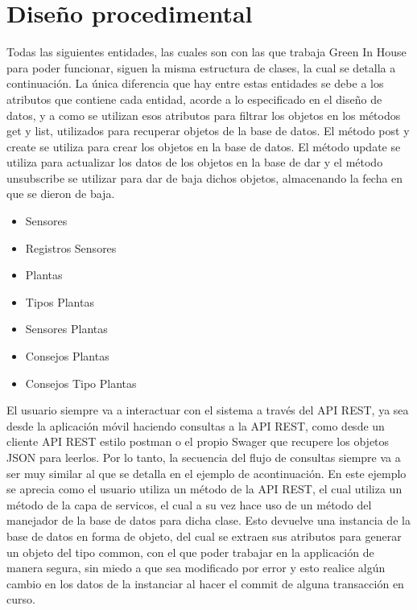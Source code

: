 \section{Diseño procedimental}
Todas las siguientes entidades, las cuales son con las que trabaja Green In House para poder funcionar, siguen la misma estructura de clases, la cual se detalla a continuación. La única diferencia que hay entre estas entidades se debe a los atributos que contiene cada entidad, acorde a lo especificado en el diseño de datos, y a como se utilizan esos atributos para filtrar los objetos en los métodos get y list, utilizados para recuperar objetos de la base de datos. El método post y create se utiliza para crear los objetos en la base de datos. El método update se utiliza para actualizar los datos de los objetos en la base de dar y el método unsubscribe se utilizar para dar de baja dichos objetos, almacenando la fecha en que se dieron de baja.
\begin{itemize}
        \item Sensores
        \item Registros Sensores
        \item Plantas
        \item Tipos Plantas
        \item Sensores Plantas
        \item Consejos Plantas
        \item Consejos Tipo Plantas
    \end{itemize}
    
  





El usuario siempre va a interactuar con el sistema a través del API REST, ya sea desde la aplicación móvil haciendo consultas a la API REST, como desde un cliente API REST estilo postman o el propio Swager que recupere los objetos JSON para leerlos. Por lo tanto, la secuencia del flujo de consultas siempre va a ser muy similar al que se detalla en el ejemplo de acontinuación. En este ejemplo se aprecia como el usuario utiliza un método de la API REST, el cual utiliza un método de la capa de servicos, el cual a su vez hace uso de un método del manejador de la base de datos para dicha clase. Esto devuelve una instancia de la base de datos en forma de objeto, del cual se extraen sus atributos para generar un objeto del tipo common, con el que poder trabajar en la applicación de manera segura, sin miedo a que sea modificado por error y esto realice algún cambio en los datos de la instanciar al hacer el commit de alguna transacción en curso.

